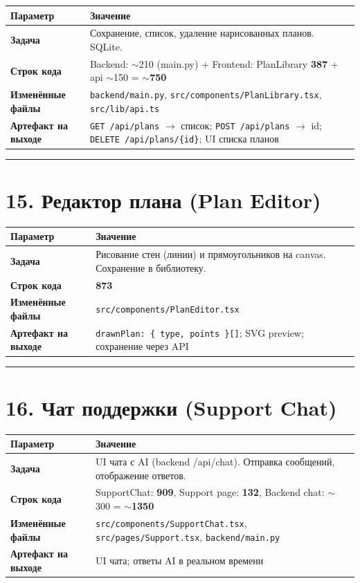 \documentclass[12pt,a4paper]{article}
\begin{document}
\begin{tabular}{>{\bfseries}l p{10cm}}
\toprule
Параметр & Значение \\
\midrule
Задача & Сохранение, список, удаление нарисованных планов. SQLite. \\
Строк кода & Backend: $\sim$210 (main.py) + Frontend: PlanLibrary \textbf{387} + api $\sim$150 = \textbf{$\sim$750} \\
Изменённые файлы & \texttt{backend/main.py}, \texttt{src/components/PlanLibrary.tsx}, \texttt{src/lib/api.ts} \\
Артефакт на выходе & \texttt{GET /api/plans} $\rightarrow$ список; \texttt{POST /api/plans} $\rightarrow$ id; \texttt{DELETE /api/plans/\{id\}}; UI списка планов \\
\bottomrule
\end{tabular}

\vspace{1em}
\hrule
\vspace{1em}

\section{15. Редактор плана (Plan Editor)}

\begin{tabular}{>{\bfseries}l p{10cm}}
\toprule
Параметр & Значение \\
\midrule
Задача & Рисование стен (линии) и прямоугольников на canvas. Сохранение в библиотеку. \\
Строк кода & \textbf{873} \\
Изменённые файлы & \texttt{src/components/PlanEditor.tsx} \\
Артефакт на выходе & \texttt{drawnPlan: \{ type, points \}[]}; SVG preview; сохранение через API \\
\bottomrule
\end{tabular}

\vspace{1em}
\hrule
\vspace{1em}

\section{16. Чат поддержки (Support Chat)}

\begin{tabular}{>{\bfseries}l p{10cm}}
\toprule
Параметр & Значение \\
\midrule
Задача & UI чата с AI (backend /api/chat). Отправка сообщений, отображение ответов. \\
Строк кода & SupportChat: \textbf{909}, Support page: \textbf{132}, Backend chat: $\sim$300 = \textbf{$\sim$1350} \\
Изменённые файлы & \texttt{src/components/SupportChat.tsx}, \texttt{src/pages/Support.tsx}, \texttt{backend/main.py} \\
Артефакт на выходе & UI чата; ответы AI в реальном времени \\
\bottomrule
\end{tabular}
\end{document}
